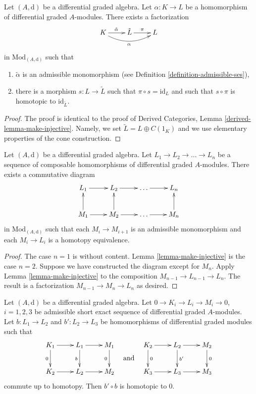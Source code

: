 \begin{lemma}
\label{lemma-make-injective}
Let $(A, \text{d})$ be a differential graded algebra.
Let $\alpha : K \to L$ be a homomorphism of differential graded
$A$-modules. There exists a factorization
$$
\xymatrix{
K \ar[r]^{\tilde \alpha} \ar@/_1pc/[rr]_\alpha &
\tilde L \ar[r]^\pi & L
}
$$
in $\text{Mod}_{(A, \text{d})}$ such that
\begin{enumerate}
\item $\tilde \alpha$ is an admissible monomorphism (see
Definition \ref{definition-admissible-ses}),
\item there is a morphism $s : L \to \tilde L$
such that $\pi \circ s = \text{id}_L$ and such that
$s \circ \pi$ is homotopic to $\text{id}_{\tilde L}$.
\end{enumerate}
\end{lemma}

\begin{proof}
The proof is identical to the proof of
Derived Categories, Lemma \ref{derived-lemma-make-injective}.
Namely, we set $\tilde L = L \oplus C(1_K)$ and we use elementary
properties of the cone construction.
\end{proof}

\begin{lemma}
\label{lemma-sequence-maps-split}
Let $(A, \text{d})$ be a differential graded algebra.
Let $L_1 \to L_2 \to \ldots \to L_n$
be a sequence of composable homomorphisms of
differential graded $A$-modules.
There exists a commutative diagram
$$
\xymatrix{
L_1 \ar[r] &
L_2 \ar[r] &
\ldots \ar[r] &
L_n \\
M_1 \ar[r] \ar[u] &
M_2 \ar[r] \ar[u] &
\ldots \ar[r] &
M_n \ar[u]
}
$$
in $\text{Mod}_{(A, \text{d})}$ such that each $M_i \to M_{i + 1}$
is an admissible monomorphism and each $M_i \to L_i$
is a homotopy equivalence.
\end{lemma}

\begin{proof}
The case $n = 1$ is without content.
Lemma \ref{lemma-make-injective} is the case $n = 2$.
Suppose we have constructed the diagram
except for $M_n$. Apply Lemma \ref{lemma-make-injective} to
the composition $M_{n - 1} \to L_{n - 1} \to L_n$.
The result is a factorization $M_{n - 1} \to M_n \to L_n$
as desired.
\end{proof}



\begin{lemma}
\label{lemma-nilpotent}
Let $(A, \text{d})$ be a differential graded algebra.
Let $0 \to K_i \to L_i \to M_i \to 0$, $i = 1, 2, 3$
be admissible short exact sequence of differential graded $A$-modules.
Let $b : L_1 \to L_2$ and $b' : L_2 \to L_3$
be homomorphisms of differential graded modules such that
$$
\vcenter{
\xymatrix{
K_1 \ar[d]_0 \ar[r] &
L_1 \ar[r] \ar[d]_b &
M_1 \ar[d]_0 \\
K_2 \ar[r] & L_2 \ar[r] & M_2
}
}
\quad\text{and}\quad
\vcenter{
\xymatrix{
K_2 \ar[d]^0 \ar[r] &
L_2 \ar[r] \ar[d]^{b'} &
M_2 \ar[d]^0 \\
K_3 \ar[r] & L_3 \ar[r] & M_3
}
}
$$
commute up to homotopy. Then $b' \circ b$ is homotopic to $0$.
\end{lemma}

